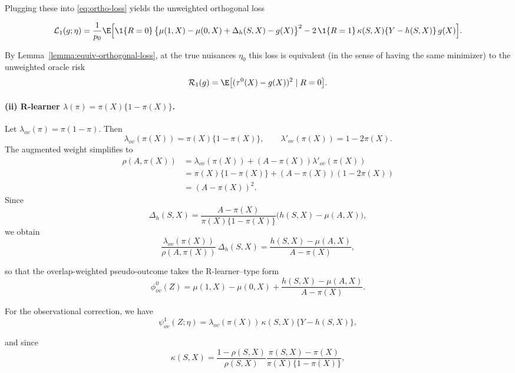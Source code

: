 \documentclass{article} %
\theoremstyle{plain} %
\theoremstyle{definition} %
\theoremstyle{remark} %
\begin{document}
Plugging these into \eqref{eq:ortho-loss} yields the unweighted orthogonal loss

\begin{equation}
\label{eq:DR-ortho-loss}
    \mathcal{L}_1(g;\eta)
  = \frac{1}{p_0}\E\Big[
      \1\{R=0\}\,\big\{\mu(1,X)-\mu(0,X) + \Delta_h(S,X)-g(X)\big\}^2
      - 2\,\1\{R=1\}\,\kappa(S,X)\{Y-h(S,X)\}\,g(X)
    \Big].
\end{equation}


By Lemma~\ref{lemma:equiv-orthogonal-loss}, at the true nuisances $\eta_0$ this loss is equivalent (in the sense of having the same minimizer) to the unweighted oracle risk
\begin{equation}
\label{eq:oracle-unweighted-loss}
    \mathcal{R}_1(g)
  = \E\bigl[(\tau^0(X)-g(X))^2\mid R=0\bigr].
\end{equation}


\paragraph{(ii) R-learner $\lambda(\pi)=\pi(X)\{1-\pi(X)\}$.}
Let $\lambda_{ov}(\pi)=\pi(1-\pi)$. Then
\[
\lambda_{ov}(\pi(X)) = \pi(X)\{1-\pi(X)\},
\qquad
\lambda'_{ov}(\pi(X)) = 1-2\pi(X).
\]
The augmented weight simplifies to
\begin{align*}
\rho(A,\pi(X))
  &= \lambda_{ov}(\pi(X)) + (A-\pi(X))\lambda'_{ov}(\pi(X)) \\
  &= \pi(X)\{1-\pi(X)\} + (A-\pi(X))(1-2\pi(X)) \\
  &= (A-\pi(X))^2.
\end{align*}
Since 
\[
\Delta_h(S,X)
  = \frac{A-\pi(X)}{\pi(X)\{1-\pi(X)\}}\bigl(h(S,X)-\mu(A,X)\bigr),
\]
we obtain
\begin{equation}
    \frac{\lambda_{ov}(\pi(X))}{\rho(A,\pi(X))}\,\Delta_h(S,X)
  = \frac{h(S,X)-\mu(A,X)}{A-\pi(X)},
\end{equation}

so that the overlap-weighted pseudo-outcome takes the R-learner–type form
\begin{equation}
    \phi^0_{ov}(Z)
  = \mu(1,X)-\mu(0,X)
    + \frac{h(S,X)-\mu(A,X)}{A-\pi(X)}.
\end{equation}

For the observational correction, we have
\begin{equation}
    \psi^1_{ov}(Z;\eta)
  = \lambda_{ov}(\pi(X))\,\kappa(S,X)\{Y-h(S,X)\},
\end{equation}

and since
\begin{equation}
    \kappa(S,X)
  = \frac{1-\rho(S,X)}{\rho(S,X)}
    \frac{\pi(S,X)-\pi(X)}{\pi(X)\{1-\pi(X)\}},
\end{equation}
\end{document}
